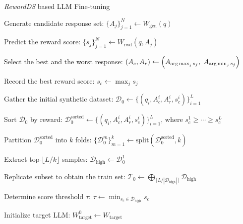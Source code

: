 \begin{algorithm}[!t]
\SetAlgoLined
      \fontsize{8pt}{9pt}\selectfont
        \caption{\footnotesize \textit{RewardDS} based LLM Fine-tuning}
\label{algo:main}

    {   
        Generate candidate response set: $\{A_j\}_{j=1}^N \gets W_\text{gen}(q)$ \label{line:refine1}
    
        Predict the reward score: $\{s_j\}_{j=1}^N \gets W_\text{rwd}(q, A_j)$
        
        Select the best and the worst response: \newline
        \hfill
        $
        (A_c, A_r) \gets \left( A_{\argmax_j s_j},\ A_{\argmin_j s_j} \right)
        $ \label{line:refine2}
        
        Record the best reward score: $s_c \gets \max_j s_j$
    }
    
    \fontsize{8pt}{10pt}\selectfont
    Gather the initial synthetic dataset: $\mathcal{D}_0 \gets \{(q_i, A^i_c, A^i_r, s_c^i )\}_{i=1}^L$
     
    Sort $\mathcal{D}_0$ by reward: $\mathcal{D}_0^\text{sorted} \gets \{(q_i, A^i_c, A^i_r, s_c^i )\}_{i=1}^L$, where \newline
      \hfill $s_c^1 \geq \cdots \geq s_c^L$
      
    Partition $\mathcal{D}_0^\text{sorted}$ into $k$ folds: $\{\mathcal{D}_0^m\}_{m=1}^k \gets \text{split}(\mathcal{D}_0^\text{sorted}, k)$

    Extract top-$\lfloor L/k \rfloor$ samples: $\mathcal{D}_\text{high} \gets \mathcal{D}_0^1$ \label{line:filter1}
    
    Replicate subset to obtain the train set: $\mathcal{T}_0 \gets \bigoplus_{\lceil L/|\mathcal{D}_\text{high}| \rceil} \mathcal{D}_\text{high}$ \label{line:filter2}

    \fontsize{8pt}{9pt}\selectfont
    Determine score threshold $\tau$: 
    $
    \tau \gets \min_{s_c \in \mathcal{D}_\text{high}} s_c
    $

    Initialize target LLM: $W_\text{target}^0 \gets W_\text{target}$
    

\end{algorithm}
